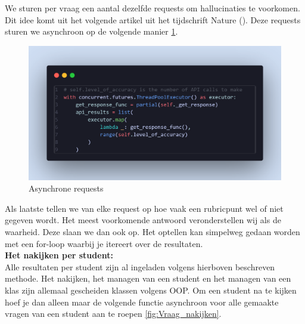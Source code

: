 \documentclass[12pt]{article}
\begin{document}
We sturen per vraag een aantal dezelfde requests om hallucinaties te voorkomen. Dit idee komt uit het volgende artikel uit het tijdschrift Nature (\cite{Farquhar2024}). Deze requests sturen we asynchroon op de volgende manier \ref{fig:async}.
\begin{figure}[H] %
    \centering
    \includegraphics[width=0.9 \textwidth]{./images/methoden/nakijken/threading.png}
    \caption{Asynchrone requests}
    \label{fig:async}
\end{figure}

Als laatste tellen we van elke request op hoe vaak een rubricpunt wel of niet gegeven wordt. Het meest voorkomende antwoord veronderstellen wij als de waarheid. Deze slaan we dan ook op. Het optellen kan simpelweg gedaan worden met een for-loop waarbij je itereert over de resultaten.\vspace{0.25cm}
\\

\textbf{Het nakijken per student:} \\
Alle resultaten per student zijn al ingeladen volgens hierboven beschreven methode. Het nakijken, het managen van een student en het managen van een klas zijn allemaal gescheiden klassen volgens OOP. Om een student na te kijken hoef je dan alleen maar de volgende functie asynchroon voor alle gemaakte vragen van een student aan te roepen \ref{fig:Vraag_nakijken}. 
\end{document}
